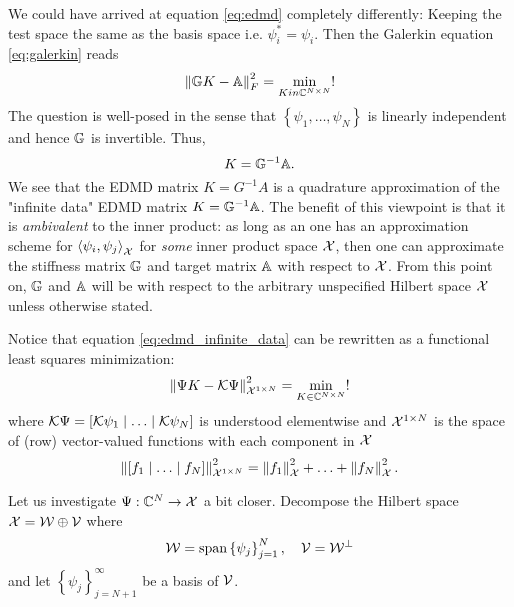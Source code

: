 We could have arrived at equation \ref{eq:edmd} completely differently: 
Keeping the test space the same as the basis space i.e. $\psi_i^* = \psi_i$. Then the 
Galerkin equation \ref{eq:galerkin} reads
\begin{equation}
    \label{eq:edmd_infinite_data}
    \left\| \mathbb{G} K - \mathbb{A} \right\|_F^2 = \min_{K in \mathbb{C}^{N \times N}} !
\end{equation}
The question is well-posed in the sense that $\left\{ \psi_1, \ldots, \psi_N \right\}$ 
is linearly independent and hence $\mathbb{G}$ is invertible. Thus,
\begin{equation}
    K = \mathbb{G}^{-1} \mathbb{A} . 
\end{equation}
We see that the EDMD matrix $K = G^{-1} A$ is a quadrature approximation of the "infinite 
data" EDMD matrix $K = \mathbb{G}^{-1} \mathbb{A}$. The benefit of this viewpoint is that it is 
\emph{ambivalent} to the inner product: as long as an one has an approximation scheme for 
$\left\langle \psi_i, \psi_j \right\rangle_{\mathcal{X}}$ for \emph{some} inner product space 
$\mathcal{X}$, then one can approximate the stiffness matrix $\mathbb{G}$ and target matrix $\mathbb{A}$ 
with respect to $\mathcal{X}$. From this point on, $\mathbb{G}$ and $\mathbb{A}$ will be with respect to 
the arbitrary unspecified Hilbert space $\mathcal{X}$ unless otherwise stated. 

Notice that equation \ref{eq:edmd_infinite_data} can be rewritten as a functional least 
squares minimization:
\begin{equation}
    \label{eq:edmd_functional}
    \left\| \Psi K - \mathcal{K} \Psi \right\|_{\mathcal{X}^{1 \times N}}^2 
    = \min_{K \in \mathbb{C}^{N \times N}} !
\end{equation}
where $\mathcal{K} \Psi = \left[ \mathcal{K} \psi_1 \mid \ldots \mid \mathcal{K} \psi_N \right]$ 
is understood elementwise and
$\mathcal{X}^{1 \times N}$ is the space of (row) vector-valued functions with each 
component in $\mathcal{X}$
\begin{equation}
    \left\| \left[ f_1 \mid \ldots \mid f_N \right] \right\|_{\mathcal{X}^{1 \times N}}^2
    = \left\| f_1 \right\|_{\mathcal{X}}^2 + \ldots + \left\| f_N \right\|_{\mathcal{X}}^2 . 
\end{equation}

Let us investigate $\Psi : \mathbb{C}^N \to \mathcal{X}$ a bit closer. Decompose the Hilbert space 
$\mathcal{X} = \mathcal{W} \oplus \mathcal{V}$ where  
\begin{equation}
    \mathcal{W} = \text{span} \left\{ \psi_j \right\}_{j=1}^N, \quad \mathcal{V} = \mathcal{W}^\perp
\end{equation}
and let $\left\{ \psi_j \right\}_{j=N+1}^\infty$ be a basis of $\mathcal{V}$. 

